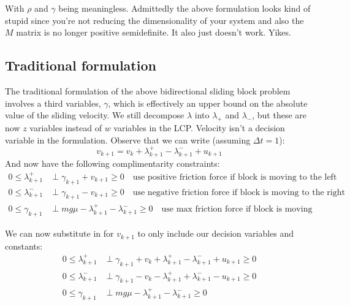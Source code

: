\documentclass{article}
\begin{document}
With $\rho$ and $\gamma$ being meaningless. Admittedly the above formulation looks kind of stupid since you're not reducing the dimensionality of your system and also the $M$ matrix is no longer positive semidefinite. It also just doesn't work. Yikes.

\subsection{Traditional formulation}
The traditional formulation of the above bidirectional sliding block problem involves a third variables, $\gamma$, which is effectively an upper bound on the absolute value of the sliding velocity. We still decompose $\lambda$ into $\lambda_+$ and $\lambda_-$, but these are now $z$ variables instead of $w$ variables in the LCP. Velocity isn't a decision variable in the formulation. Observe that we can write (assuming $\Delta t = 1$):
\[
    v_{k+1} = v_k + \lambda^+_{k+1} - \lambda^-_{k+1} + u_{k+1}
\]
And now have the following complimentarity constraints:
\begin{align*}
    0 \leq \lambda^+_{k+1} &\perp \gamma_{k+1} + v_{k+1} \geq 0 \quad \textrm{use positive friction force if block is moving to the left}\\
    0 \leq \lambda^-_{k+1} &\perp \gamma_{k+1} - v_{k+1} \geq 0 \quad \textrm{use negative friction force if block is moving to the right}\\
    0 \leq \gamma_{k+1} &\perp m g \mu - \lambda^+_{k+1} - \lambda^-_{k+1} \geq 0 \quad \textrm{use max friction force if block is moving}
\end{align*}

We can now substitute in for $v_{k+1}$ to only include our decision variables and constants:
\begin{align*}
    0 \leq \lambda^+_{k+1} &\perp \gamma_{k+1} + v_k + \lambda^+_{k+1} - \lambda^-_{k+1} + u_{k+1} \geq 0 \\
    0 \leq \lambda^-_{k+1} &\perp \gamma_{k+1} - v_k - \lambda^+_{k+1} + \lambda^-_{k+1} - u_{k+1} \geq 0 \\
    0 \leq \gamma_{k+1} &\perp m g \mu - \lambda^+_{k+1} - \lambda^-_{k+1} \geq 0
\end{align*}
\end{document}
